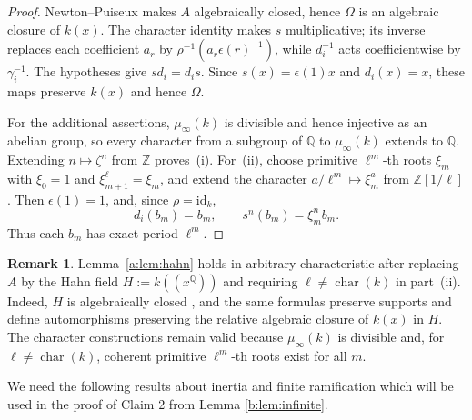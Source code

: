 \documentclass[11pt,a4paper]{amsart}
\theoremstyle{definition}
\newtheorem{remark}[theorem]{Remark}
\newcommand{\Q}{\mathbb Q}
\newcommand{\Z}{\mathbb Z}
\DeclareMathOperator{\charac}{char}
\begin{document}
\begin{proof}
Newton--Puiseux makes $A$ algebraically closed, hence
$\Omega$ is an algebraic closure of $k(x)$.
The character identity makes $s$ multiplicative;
its inverse replaces each coefficient $a_r$ by
$\rho^{-1}(a_r\epsilon(r)^{-1})$, while $d_i^{-1}$
acts coefficientwise by $\gamma_i^{-1}$.
The hypotheses give $sd_i=d_is$.
Since $s(x)=\epsilon(1)x$ and $d_i(x)=x$, these maps
preserve $k(x)$ and hence $\Omega$.

For the additional assertions, $\mu_\infty(k)$ is divisible
and hence injective as an abelian group, so every character
from a subgroup of $\Q$ to $\mu_\infty(k)$ extends to $\Q$.
Extending $n\mapsto\zeta^n$ from $\Z$ proves~\textup{(i)}.
For~\textup{(ii)}, choose primitive $\ell^m$-th roots $\xi_m$
with $\xi_0=1$ and $\xi_{m+1}^{\ell}=\xi_m$, and extend
the character $a/\ell^m\mapsto\xi_m^a$ from $\Z[1/\ell]$.
Then $\epsilon(1)=1$, and, since $\rho=\mathrm{id}_k$,
\[
d_i(b_m)=b_m,\qquad s^n(b_m)=\xi_m^n b_m.
\]
Thus each $b_m$ has exact period $\ell^m$.
\end{proof}
\begin{remark}\label{pposit}
Lemma~\ref{a:lem:hahn} holds in arbitrary characteristic
after replacing $A$ by the Hahn field $H:=k((x^{\Q}))$
and requiring $\ell\ne\charac(k)$ in part~\textup{(ii)}.
Indeed, $H$ is algebraically closed
\cite[Corollary~4]{Poonen}, and the same formulas preserve
supports and define automorphisms preserving the relative
algebraic closure of $k(x)$ in $H$.
The character constructions remain valid because
$\mu_\infty(k)$ is divisible and, for
$\ell\ne\charac(k)$, coherent primitive $\ell^m$-th
roots exist for all $m$.
\end{remark}
We need the following results about inertia and finite ramification which will be used in the proof of Claim 2 from Lemma \ref{b:lem:infinite}.
\end{document}
